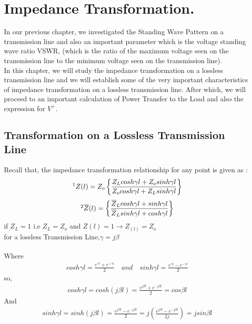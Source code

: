 \chapter{Impedance Transformation.}
In our previous chapter, we investigated the Standing Wave Pattern on a transmission line and also an important parameter which is the voltage standing wave ratio VSWR, (which is the ratio of the maximum voltage seen on the transmission line to the minimum voltage seen on the transmission line).\\

In this chapter, we will study the impedance transformation on a lossless
transmission line and we will establish some of the very important characteristics of impedance transformation on a lossless transmission line. After which, we will proceed to an important calculation of Power Transfer to the Load and also the expression for $V^{+}$.
\section{Transformation on a Lossless Transmission Line}
Recall that, the impedance transformation relationship for any point is given as :
\begin{align*}
\footnotemark[1]Z(l) = Z_o\left\lbrace \frac{Z_Lcosh\gamma l + Z_osinh\gamma l}{Z_ocosh\gamma l + Z_Lsinh\gamma l}\right\rbrace 
\end{align*}
\begin{align*}
\footnotemark[2]\overline{Z}(l) = \left\lbrace \frac{\overline{Z}_Lcosh\gamma l + sinh\gamma l}{\overline{Z}_Lsinh\gamma l + cosh\gamma l}\right\rbrace 
\end{align*}
if $Z_L = 1$ i.e $Z_L = Z_o$ and $\overline{Z}(l) = 1 \rightarrow  Z_(l) = Z_o$\\
 for a lossless Transmission Line,$\gamma=j\beta$\\\\
 Where
\begin{align*}
cosh\gamma l = \frac{e^{\gamma l} + e^{-\gamma l}}{2} \quad and \quad sinh\gamma l = \frac{e^{\gamma l} - e^{-\gamma l}}{2}
\end{align*}
so,
\begin{align*}
cosh\gamma l= cosh(j\beta l)=\frac{e^{j \beta l} + e^{-j \beta l}}{2}=cos\beta l
\end{align*}
And
\begin{align*}
sinh\gamma l=sinh(j \beta l) = \frac{e^{j \beta l} - e^{-j \beta l}}{2}=j\left( \frac{e^{j \beta l} - e^{-j \beta l}}{2j}\right) =jsin\beta l
\end{align*}

